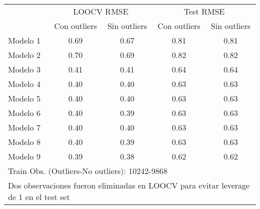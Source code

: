 \begin{table}[!h]
\centering
\begin{tabular}{lcccc}
\toprule
\multicolumn{1}{c}{} & \multicolumn{2}{c}{LOOCV RMSE} & \multicolumn{2}{c}{Test RMSE} \\
\cmidrule(l{3pt}r{3pt}){2-3} \cmidrule(l{3pt}r{3pt}){4-5}
 & Con outliers & Sin outliers & Con outliers & Sin outliers\\
\midrule
Modelo 1 & 0.69 & 0.67 & 0.81 & 0.81\\
Modelo 2 & 0.70 & 0.69 & 0.82 & 0.82\\
Modelo 3 & 0.41 & 0.41 & 0.64 & 0.64\\
Modelo 4 & 0.40 & 0.40 & 0.63 & 0.63\\
Modelo 5 & 0.40 & 0.40 & 0.63 & 0.63\\
\addlinespace
Modelo 6 & 0.40 & 0.39 & 0.63 & 0.63\\
Modelo 7 & 0.40 & 0.40 & 0.63 & 0.63\\
Modelo 8 & 0.40 & 0.39 & 0.63 & 0.63\\
Modelo 9 & 0.39 & 0.38 & 0.62 & 0.62\\
\bottomrule
\multicolumn{5}{l}{\rule{0pt}{1em}Train Obs. (Outliers-No outliers): 10242-9868}\\
\multicolumn{5}{l}{\rule{0pt}{1em}Dos observaciones fueron eliminadas en LOOCV para evitar leverage de 1 en el test set}\\
\end{tabular}
\end{table}

